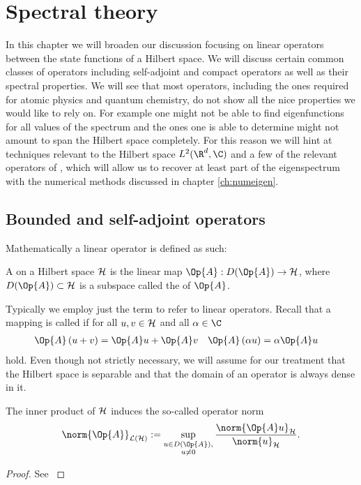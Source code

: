 \section{Spectral theory}
\label{sec:spectral}

In this chapter we will broaden our discussion focusing
on linear operators between the state functions of a Hilbert space.
We will discuss certain common classes of operators
including self-adjoint and compact operators as well as their spectral properties.
We will see that most operators, including the ones required for
atomic physics and quantum chemistry,
do not show all the nice properties we would like to rely on.
For example one might not be able to find eigenfunctions
for all values of the spectrum and the ones one is able to determine
might not amount to span the Hilbert space completely.
For this reason we will hint at techniques
relevant to the Hilbert space $L^2(\R^d, \C)$
and a few of the relevant operators of \QM,
which will allow us to recover at least part of the eigenspectrum
with the numerical methods discussed in chapter \vref{ch:numeigen}.

\subsection{Bounded and self-adjoint operators}

Mathematically a linear operator is defined as such:
\begin{defn}
	A  on a Hilbert space $\mathcal{H}$
	is the linear map $\Op{A} : D(\Op{A}) \to \hilbert$,
	where $D(\Op{A}) \subset \hilbert$ is a subspace
	called the  of $\Op{A}$.
\end{defn}
Typically we employ just the term  to refer to linear operators.
Recall that a mapping is called  if
for all $u, v \in \mathcal{H}$ and all $\alpha \in \C$
\begin{align}
	\label{eqn:OperatorLinear}
	\Op{A}\left(u + v\right) &= \Op{A}u + \Op{A}v &
	\Op{A}\left(\alpha u\right) &= \alpha \Op{A}u
\end{align}
hold.
Even though not strictly necessary, we will assume for our treatment
that the Hilbert space is separable and that the domain of an operator
is always dense in it.

\newcommand{\opnorm}[1]{\norm{#1}_{\mathcal{L}(\hilbert)}}
\begin{prop}
	The inner product of $\mathcal{H}$ induces the so-called operator norm
	\[ \opnorm{\Op{A}} := \sup_{\substack{u \in D(\Op{A}),\\ u\neq0}}
		\frac{\norm{\Op{A} u}_\hilbert}{\norm{u}_{\hilbert}}. \]
	\begin{proof}
		See \cite[Satz II.1.4]{Werner2011}
	\end{proof}
\end{prop}

